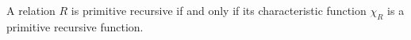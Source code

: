 A relation $R$ is primitive recursive if and only if its characteristic function $\chi_R$ is a primitive recursive function.
